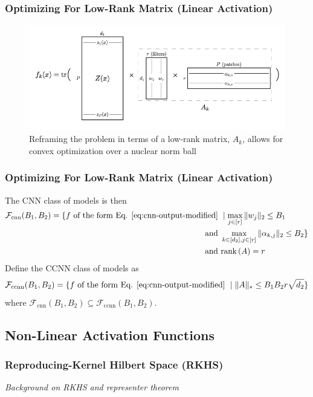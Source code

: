 \documentclass[hyperref={colorlinks}]{beamer}
\newcommand{\rank}[1]{\text{rank}\left(#1\right)}
\begin{document}
\begin{frame}
	\frametitle{Optimizing For Low-Rank Matrix (Linear Activation)}
	\begin{figure}
		\includegraphics[scale=0.3]{Linear-Case-Structure.png}
		\caption{Reframing the problem in terms of a low-rank matrix, $A_k$, allows for convex optimization over a nuclear norm ball}
		\label{fig:linear-case-structure}
	\end{figure}
\end{frame}

\begin{frame}
	\frametitle{Optimizing For Low-Rank Matrix (Linear Activation)}
	The CNN class of models is then
	\begin{align}
		\mathcal{F}_{\text{cnn}}(B_1, B_2) = \{f \text{ of the form Eq. \ref{eq:cnn-output-modified} } & \mid \max_{j \in [r]} \|w_j\|_2 \leq B_1 \\ \nonumber
		\text{ and } & \max_{k \in [d_2], j \in [r]} \|\alpha_{k, j}\|_2 \leq B_2\} \\ \nonumber
		\text{ and } & \rank{A} = r
		\label{eq:fcnn-class-modified}
	\end{align}
	Define the CCNN class of models as
	\begin{equation}
		\mathcal{F}_{\text{ccnn}}(B_1, B_2) = \{f \text{ of the form Eq. \ref{eq:cnn-output-modified} } \mid \|A\|_* \leq B_1 B_2 r \sqrt{d_2}\}
		\label{eq:fccnn-class}
	\end{equation}
	where $\mathcal{F}_{\text{cnn}}(B_1, B_2) \subseteq \mathcal{F}_{\text{ccnn}}(B_1, B_2)$.
\end{frame}

\subsection{Non-Linear Activation Functions}
\begin{frame}
	\frametitle{Reproducing-Kernel Hilbert Space (RKHS)}
	\textit{Background on RKHS and representer theorem}
\end{frame}
\end{document}
